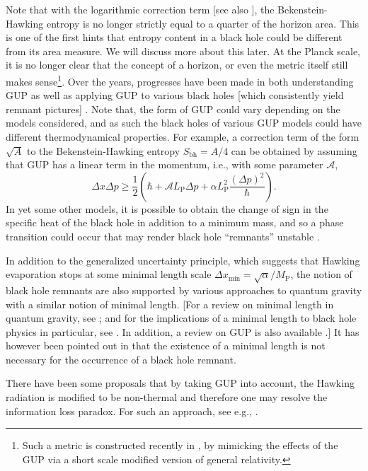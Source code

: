\documentclass[12pt]{article}
\newcommand{\2}{$^2$}
\newcommand{\3}{$^3$}
\newcommand{\4}{$_4$}
\newcommand{\5}{$_5$}
\begin{document}
Note that with the logarithmic correction term [see also \cite{0611028}], the Bekenstein-Hawking entropy is no longer strictly equal to a quarter of the horizon area. This is one of the first hints that entropy content in a black hole could be different from its area measure. We will discuss more about this later. At the Planck scale, it is no longer clear that the concept of a horizon, or even the metric itself still makes sense\footnote{Such a metric is constructed recently in \cite{IMN}, by mimicking the effects of the GUP via a short scale modified version of general relativity. }.  Over the years, progresses have been made in both understanding GUP as well as applying GUP to various black holes [which consistently yield remnant pictures] \cite{0511054, 0704.1261, 1002.2302, DCXZ, 1306.5298, 1307.7045, 1307.1894, 1307.0172, 1312.3781, 1402.2133, 1404.6375, HAK, AHM}. Note that, the form of GUP could vary depending on the models considered, and as such the black holes of various GUP models could have different thermodynamical properties. For example, a correction term of the form $\sqrt{A}$ to the Bekenstein-Hawking entropy $S_{\text{bh}}=A/4$ can be obtained \cite{1402.2133} by assuming that GUP has a linear term in the momentum, i.e., with some parameter $\mathcal{A}$,
\begin{equation}
\Delta x\Delta p \geqslant\frac{1}{2}\left(\hbar + \mathcal{A}  L_{\text{P}} \Delta p+ \alpha L_{\text{P}}^2\frac{(\Delta p)^2}{\hbar}\right).
\end{equation}
In yet some other models, it is possible to obtain the change of sign in the specific heat of the black hole in addition to a minimum mass, and so a phase transition could occur that  may render black hole ``remnants'' unstable \cite{1205.3680}. 

In addition to the generalized uncertainty principle, which suggests that Hawking evaporation stops at some minimal length scale $\Delta x_{\mathrm{min}} = \sqrt{\alpha}/M_{\mathrm{P}}$, 
the notion of black hole remnants are also supported by various approaches to quantum gravity with a similar notion of minimal length. [For a review on minimal length in quantum gravity, see \cite{sabine2}; and for the implications of a minimal length to black hole physics in particular, see \cite{CMN}. In addition, a review on GUP is also available \cite{tawfik}.]  It has however been pointed out in \cite{DMZ} that the existence of a minimal length is not necessary for the occurrence of a black hole remnant. 

There have been some proposals that by taking GUP into account, the Hawking radiation is modified to be non-thermal and therefore one may resolve the information loss paradox. For such an approach, see e.g., \cite{0804.4221, 0905.0948}. 
\end{document}
